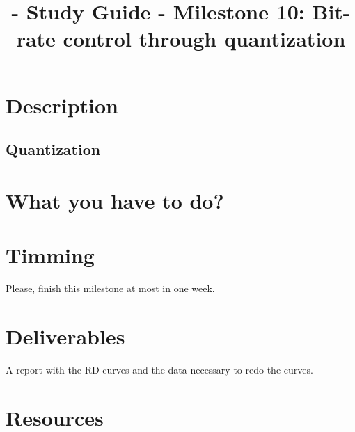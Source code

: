 
\title{\TM{} - Study Guide - Milestone 10: Bit-rate control through quantization}

\maketitle

\section{Description}

\subsection{Quantization}




\section{What you have to do?}


\section{Timming}

Please, finish this milestone at most in one week.

\section{Deliverables}

A report with the RD curves and the data necessary to redo the curves.

\section{Resources}


